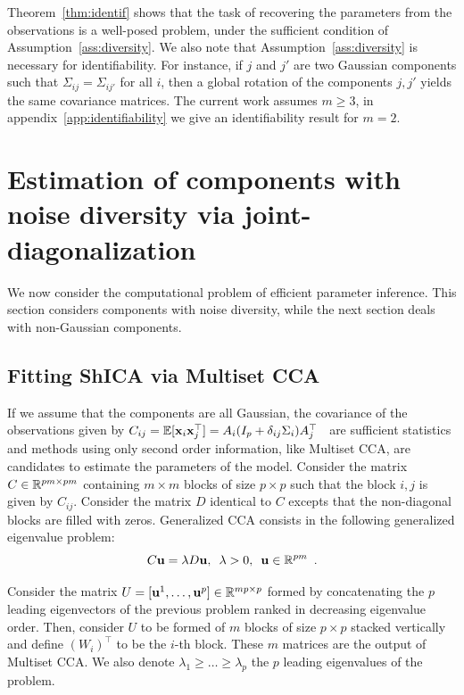 \documentclass{report}
\begin{document}
Theorem~\ref{thm:identif} shows that the task of recovering the parameters from the observations is a well-posed problem, under the sufficient condition of Assumption~\ref{ass:diversity}.  We also note that Assumption~\ref{ass:diversity} is necessary for identifiability. For instance, if $j$ and $j'$ are two Gaussian components such that $\Sigma_{ij} = \Sigma_{ij'}$ for all $i$, then a global rotation of the components $j, j'$ yields the same covariance matrices. The current work assumes $m \geq 3$, in appendix~\ref{app:identifiability} we give an identifiability result for $m=2$.



\section{Estimation of components with noise diversity via joint-diagonalization}

We now consider the computational problem of efficient parameter inference. This section considers components with noise diversity, while the next section deals with non-Gaussian components.


\subsection{Fitting ShICA via Multiset CCA}
If we assume that the components are all Gaussian, %
the covariance of the observations given by
$C_{ij}=  \mathbb{E}[\mathbf{x}_i\mathbf{x}_j^\top] = A_i(I_p + \delta_{ij}\Sigma_i)A_j^{\top}\enspace
$ are sufficient statistics and methods using only second order information, like Multiset CCA, are candidates to estimate the parameters of the model.
Consider the
matrix $C \in \mathbb{R}^{pm \times pm}$ containing $m \times m$ blocks of size $p
\times p$
such that the block $i,j$ is given by $C_{ij}$. Consider the matrix $D$ identical to $C$ excepts that the non-diagonal blocks are filled with zeros. 
Generalized CCA consists in the following generalized eigenvalue problem:
\begin{equation}
\label{eq:eigv}
    C \mathbf{u} = \lambda D\mathbf{u},\enspace \lambda > 0,\enspace \mathbf{u}\in\mathbb{R}^{pm} \enspace .
\end{equation}
  
Consider the matrix $U = [\mathbf{u}^1, \dots, \mathbf{u}^p] \in \mathbb{R}^{mp \times p}$ formed by concatenating the $p$ leading eigenvectors of the previous problem ranked in decreasing eigenvalue order. Then, consider $U$ to be formed of $m$ blocks of size $p \times p$ stacked vertically and define $(W_i)^{\top}$ to be the $i$-th block. These $m$ matrices are the output of Multiset CCA. We also denote $\lambda_1 \geq \dots \geq \lambda_p$ the $p$ leading eigenvalues of the problem.
\end{document}
